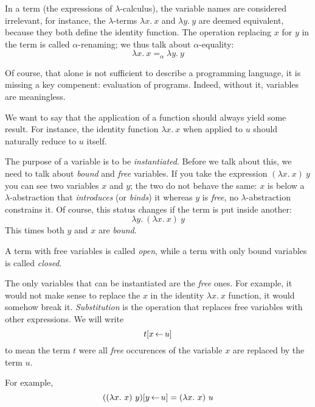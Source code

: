 In a term (the expressions of \(\lambda\)-calculus), the variable names are
considered irrelevant, for instance, the \(\lambda\)-terms \(\lambda x.\ x\)
and \(\lambda y.\ y\) are deemed equivalent, because they both define the
identity function.
The operation replacing \(x\) for \(y\) in the term is called
\(\alpha\)-renaming; we thus talk about \(\alpha\)-equality:
\[
  \lambda x.\ x =_\alpha \lambda y.\ y
\]

Of course, that alone is not sufficient to describe a programming language,
it is missing a key compenent: evaluation of programs.
Indeed, without it, variables are meaningless.

We want to say that the application of a function should always yield some
result. For instance, the identity function \(\lambda x.\ x\) when applied to
\(u\) should naturally reduce to \(u\) itself.

The purpose of a variable is to be \emph{instantiated}.
Before we talk about this, we need to talk about \emph{bound} and \emph{free}
variables.
If you take the expression \((\lambda x.\ x)\ y\) you can see two variables
\(x\) and \(y\); the two do not behave the same: \(x\) is below a
\(\lambda\)-abstraction that \emph{introduces} (or \emph{binds}) it whereas
\(y\) is \emph{free}, no \(\lambda\)-abstraction constrains it.
Of course, this status changes if the term is put inside another:
\[
  \lambda y.\ (\lambda x.\ x)\ y
\]
This times both \(y\) and \(x\) are \emph{bound}.

A term with free variables is called \emph{open}, while a term with only bound
variables is called \emph{closed}.

The only variables that can be instantiated are the \emph{free} ones.
For example, it would not make sense to replace the \(x\) in the identity
\(\lambda x.\ x\) function, it would somehow break it. \emph{Substitution} is
the operation that replaces free variables with other expressions.
We will write
\[
  t[x \mathop{\leftarrow} u]
\]
to mean the term \(t\) were all \emph{free} occurences of the variable \(x\)
are replaced by the term \(u\).

For example,
\[
  ((\lambda x.\ x)\ y)[y \mathop{\leftarrow} u] = (\lambda x.\ x)\ u
\]

